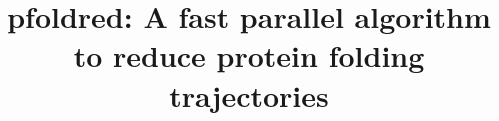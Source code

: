 \documentclass[twocolumn]{bmcart}%
\begin{document}
\begin{frontmatter}

\begin{fmbox}


\title{pfoldred: A fast parallel algorithm to reduce protein folding trajectories}

	\author[
		 addressref={aff1},                   %
		 email={lgarreta@agrosavia.co}   %
	]{ }
	\author[
		 addressref={aff2},
		 email={mmartinez@ebi.ac.uk}
	]{ }
	\author[
		 addressref={aff3},
		 email={nediaz@unicauca.edu.co}
	]{ }
	\author[
		 addressref={aff4},
		 corref={aff4},                       %
		 email={pedro.moreno@correounivalle.edu.co}
	]{ }


\end{fmbox}
\end{frontmatter}
\end{document}
